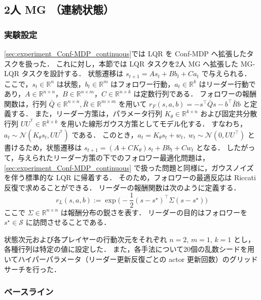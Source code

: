 \documentclass[originalpaper,fleqn]{jsaiart}     %
\providecommand{\R}{\mathbb{R}} %
\providecommand{\T}{\ensuremath{^{\mathrm{T}}}} %
\begin{document}
\subsection{2人 MG （連続状態）}\label{sec:experiment_MG_continuous}

\subsubsection{実験設定}

\ref{sec:experiment_Conf-MDP_continuous}では LQR を Conf-MDP へ拡張したタスクを扱った．
これに対し，本節では LQR タスクを2人 MG へ拡張した MG-LQR タスクを設計する．
状態遷移は
$s_{t+1} = A s_{t} + B b_{t} + C a_{t}$
で与えられる．
ここで，$s_{t}\in\R^n$ は状態，$b_{t}\in\R^m$ はフォロワー行動，$a_{t}\in\R^k$ はリーダー行動であり，$A \in \R^{n\times n}$，$B \in \R^{n \times m}$，$C \in \R^{n \times k}$ は定数行列である．
フォロワーの報酬関数は，行列 $\bar{Q}\in\R^{n\times n},\bar{R}\in\R^{m\times m}$ を用いて $r_F(s, a, b) = - s^{\top} \bar{Q} s - b^{\top} \bar{R} b$ と定義する．
また，リーダー方策は，パラメータ行列 $K_{\theta} \in \R^{k \times n}$ および固定共分散行列 $UU^{\T} \in \R^{k \times k}$ を用いた線形ガウス方策としてモデル化する．
すなわち，$a_{t}\sim \mathcal{N}(K_{\theta} s_{t}, UU^{\T})$ である．
このとき，$a_t = K_\theta s_t + w_t,\; w_t \sim \mathcal{N}(0,UU^\top)$ 
と書けるため，状態遷移は 
$s_{t+1} = (A + CK_{\theta}) s_{t} + B b_{t} + C w_{t}$ 
となる．
したがって，与えられたリーダー方策の下でのフォロワー最適化問題は，\ref{sec:experiment_Conf-MDP_continuous}
で扱った問題と同様に，ガウスノイズを伴う標準的な LQR に帰着する．
そのため，フォロワーの最適反応は Riccati 反復で求めることができる．
リーダーの報酬関数は次のように定義する．
\begin{equation*}
    r_L(s, a, b) := \exp\Big( -\frac{1}{2} (s - s^\star)^\top \Sigma (s - s^\star) \Big)
\end{equation*}
ここで $\Sigma \in \R^{n \times n}$ は報酬分布の鋭さを表す．
リーダーの目的はフォロワーを $s^\star \in \mathcal{S}$ に訪問させることである．

状態次元および各プレイヤーの行動次元をそれぞれ $n=2$, $m=1$, $k=1$ とし，各種行列は特定の値に設定した．
また，各手法について20個の乱数シードを用いてハイパーパラメータ（リーダー更新反復ごとの actor 更新回数）のグリッドサーチを行った．

\subsubsection{ベースライン}
\end{document}
